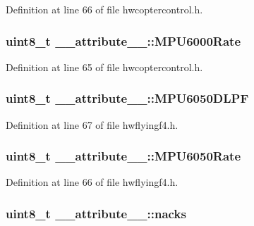 \-Definition at line 66 of file hwcoptercontrol.\-h.

\hypertarget{struct____attribute_____aa84a1694ebf9da07deab91beab0eca1d}{
\subsubsection[{\-M\-P\-U6000\-Rate}]{\setlength{\rightskip}{0pt plus 5cm}uint8\-\_\-t {\bf \-\_\-\-\_\-attribute\-\_\-\-\_\-\-::\-M\-P\-U6000\-Rate}}}\label{struct____attribute_____aa84a1694ebf9da07deab91beab0eca1d}


\-Definition at line 65 of file hwcoptercontrol.\-h.

\hypertarget{struct____attribute_____a24dc4a300602ff8d9b4dba0548820650}{
\subsubsection[{\-M\-P\-U6050\-D\-L\-P\-F}]{\setlength{\rightskip}{0pt plus 5cm}uint8\-\_\-t {\bf \-\_\-\-\_\-attribute\-\_\-\-\_\-\-::\-M\-P\-U6050\-D\-L\-P\-F}}}\label{struct____attribute_____a24dc4a300602ff8d9b4dba0548820650}


\-Definition at line 67 of file hwflyingf4.\-h.

\hypertarget{struct____attribute_____a383b5a221a0e9d60ce8cb68d3854fac0}{
\subsubsection[{\-M\-P\-U6050\-Rate}]{\setlength{\rightskip}{0pt plus 5cm}uint8\-\_\-t {\bf \-\_\-\-\_\-attribute\-\_\-\-\_\-\-::\-M\-P\-U6050\-Rate}}}\label{struct____attribute_____a383b5a221a0e9d60ce8cb68d3854fac0}


\-Definition at line 66 of file hwflyingf4.\-h.

\hypertarget{struct____attribute_____ad6e6261c47652a449e1d302153be77c9}{
\subsubsection[{nacks}]{\setlength{\rightskip}{0pt plus 5cm}uint8\-\_\-t {\bf \-\_\-\-\_\-attribute\-\_\-\-\_\-\-::nacks}}}\label{struct____attribute_____ad6e6261c47652a449e1d302153be77c9}


